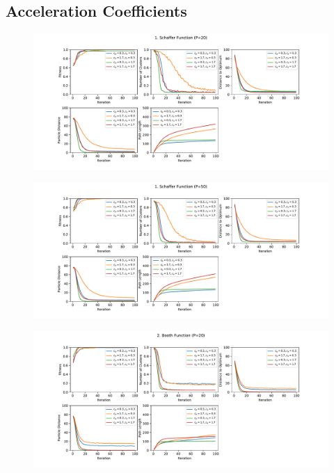\documentclass[12pt]{article}
\begin{document}
\subsection{Acceleration Coefficients}
\begin{figure}
	\centering
	\includegraphics[width=1\textwidth]{figures/ex4/ex4-1-20.pdf}
	\label{fig:ex4-1-20}
\end{figure}
\begin{figure}
	\centering
	\includegraphics[width=1\textwidth]{figures/ex4/ex4-1-50.pdf}
	\label{fig:ex4-1-50}
\end{figure}
\begin{figure}
	\centering
	\includegraphics[width=1\textwidth]{figures/ex4/ex4-2-20.pdf}
	\label{fig:ex4-2-20}
\end{figure}
\end{document}
